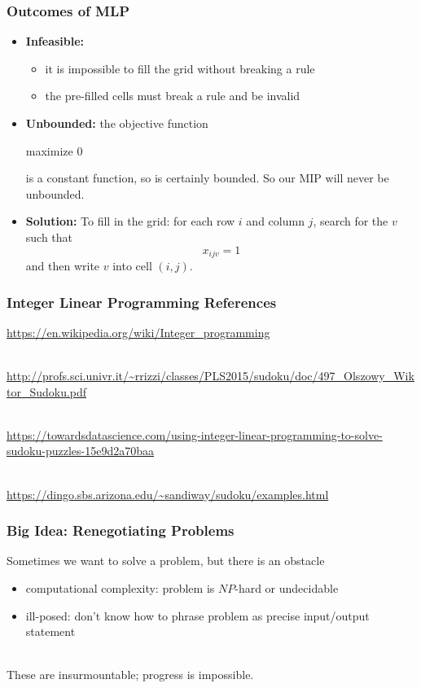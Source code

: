 \documentclass{beamer}
\newcommand{\stanza}{ \\~\ }
\begin{document}
\begin{frame} \frametitle{Outcomes of MLP}
  \begin{itemize}
  \item \textbf{Infeasible:}
    \begin{itemize}
    \item it is impossible to fill the grid without breaking a rule
    \item the pre-filled cells must break a rule and be invalid
    \end{itemize}
  \item \textbf{Unbounded:} the objective function

    maximize 0

    is a constant function, so is certainly bounded. So our MIP will
    never be unbounded.

  \item \textbf{Solution:} To fill in the grid: for each row $i$ and
    column $j$, search for the $v$ such that
    \[ x_{ijv}=1 \]
    and then write $v$ into cell $(i, j).$

  \end{itemize}
\end{frame}

\begin{frame} \frametitle{Integer Linear Programming References}
  \url{https://en.wikipedia.org/wiki/Integer_programming}
  \stanza
  
  \url{http://profs.sci.univr.it/~rrizzi/classes/PLS2015/sudoku/doc/497_Olszowy_Wiktor_Sudoku.pdf}
  \stanza

  \url{https://towardsdatascience.com/using-integer-linear-programming-to-solve-sudoku-puzzles-15e9d2a70baa}
  \stanza

  \url{https://dingo.sbs.arizona.edu/~sandiway/sudoku/examples.html}
\end{frame}

\begin{frame} \frametitle{Big Idea: Renegotiating Problems}
  Sometimes we want to solve a problem, but there is an obstacle
  \begin{itemize}
    \item computational complexity: problem is $NP$-hard or undecidable
    \item ill-posed: don't know how to phrase problem as precise input/output statement
    \stanza
  \end{itemize}
  
  These are insurmountable; progress is impossible.
  \end{frame}
  
\end{document}
